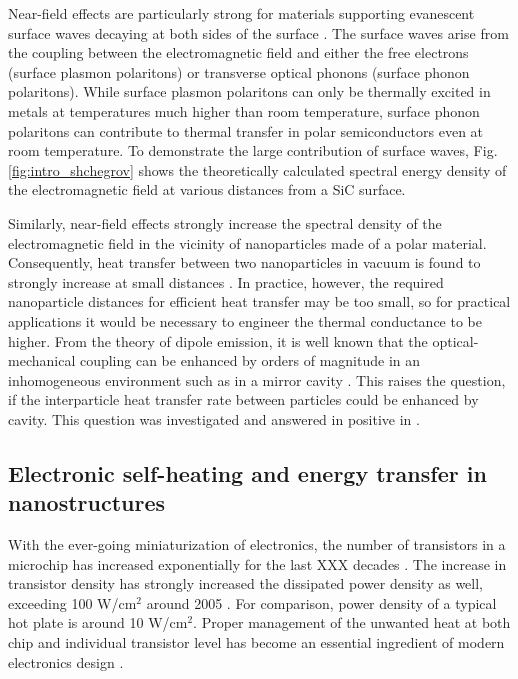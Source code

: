 Near-field effects are particularly strong for materials supporting evanescent surface waves decaying at both sides of the surface \cite{shchegrov00}. The surface waves arise from the coupling between the electromagnetic field and either the free electrons (surface plasmon polaritons) or transverse optical phonons (surface phonon polaritons). While surface plasmon polaritons can only be thermally excited in metals at temperatures much higher than room temperature, surface phonon polaritons can contribute to thermal transfer in polar semiconductors even at room temperature. To demonstrate the large contribution of surface waves, Fig. \ref{fig:intro_shchegrov} shows the theoretically calculated \cite{shchegrov00} spectral energy density of the electromagnetic field at various distances from a SiC surface.

Similarly, near-field effects strongly increase the spectral density of the electromagnetic field in the vicinity of nanoparticles made of a polar material. Consequently, heat transfer between two nanoparticles in vacuum is found to strongly increase at small distances \cite{domingues05}. In practice, however, the required nanoparticle distances for efficient heat transfer may be too small, so for practical applications it would be necessary to engineer the thermal conductance to be higher. From the theory of dipole emission, it is well known that the optical-mechanical coupling can be enhanced by orders of magnitude in an inhomogeneous environment such as in a mirror cavity \cite{novotny}. This raises the question, if the interparticle heat transfer rate between particles could be enhanced by cavity. This question was investigated and answered in positive in .


\subsection{Electronic self-heating and energy transfer in nanostructures}
\label{sec:intro_electrons}

With the ever-going miniaturization of electronics, the number of transistors in a microchip has increased exponentially for the last XXX decades \cite{}. The increase in transistor density has strongly increased the dissipated power density as well, exceeding 100 W/cm$^2$ around 2005 \cite{pop10}. For comparison, power density of a typical hot plate is around 10 W/cm$^2$. Proper management of the unwanted heat at both chip and individual transistor level has become an essential ingredient of modern electronics design \cite{pop06_ieee}.

